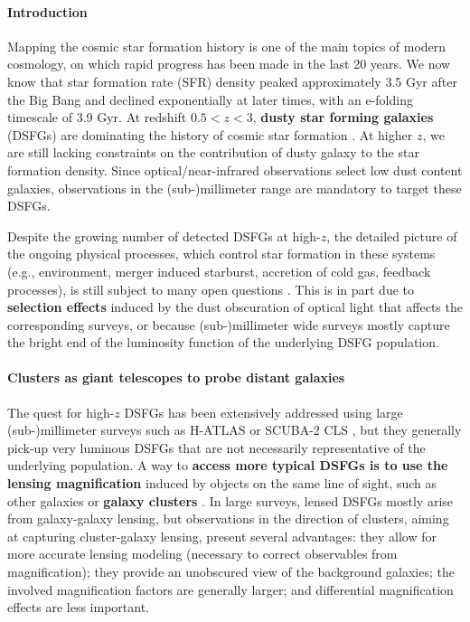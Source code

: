 \documentclass[11pt,a4paper,twoside,graphicx,color]{article}
\begin{document}
\paragraph{\large Introduction}
Mapping the cosmic star formation history is one of the main topics of modern cosmology, on which rapid progress has been made in the last 20 years.  We now know that star formation rate (SFR) density peaked approximately 3.5 Gyr after the Big Bang \citep{Madau2014} and declined exponentially at later times, with an e-folding timescale of 3.9 Gyr. At redshift $0.5 < z < 3$, {\bf dusty star forming galaxies} (DSFGs) are dominating the history of cosmic star formation \citep[e.g.,][]{Dole2006,Burgarella2013}. At higher $z$, we are still lacking constraints on the contribution of dusty galaxy to the star formation density.  Since optical/near-infrared observations select low dust content galaxies, observations in the (sub-)millimeter range are mandatory to target these DSFGs.

Despite the growing number of detected DSFGs at high-$z$, the detailed picture of the ongoing physical processes, which control star formation in these systems (e.g., environment, merger induced starburst, accretion of cold gas, feedback processes), is still subject to many open questions \citep{Casey2014}. This is in part due to {\bf selection effects} induced by the dust obscuration of optical light that affects the corresponding surveys, or because (sub-)millimeter wide surveys mostly capture the bright end of the luminosity function of the underlying DSFG population.

\paragraph{\large Clusters as giant telescopes to probe distant galaxies}
The quest for high-$z$ DSFGs has been extensively addressed using large (sub-)millimeter surveys such as H-ATLAS \citep{Eales2010} or SCUBA-2 CLS \citep{Geach2016}, but they generally pick-up very luminous DSFGs that are not necessarily representative of the underlying population. A way to {\bf access more typical DSFGs is to use the lensing magnification} induced by objects on the same line of sight, such as other galaxies or {\bf galaxy clusters} \citep[e.g., SPT results,][]{Vieira2013}. In large surveys, lensed DSFGs mostly arise from galaxy-galaxy lensing, but observations in the direction of clusters, aiming at capturing cluster-galaxy lensing, present several advantages: they allow for more accurate lensing modeling (necessary to correct observables from magnification); they provide an unobscured view of the background galaxies; the involved magnification factors are generally larger; and differential magnification effects are less important.
\end{document}

